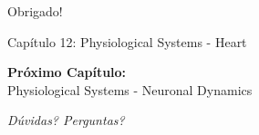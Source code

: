 \begin{frame}
\begin{center}
{\Huge Obrigado!}

\vspace{1cm}

{\Large Capítulo 12: Physiological Systems - Heart}

\vspace{1cm}

\textbf{Próximo Capítulo:}\\
Physiological Systems - Neuronal Dynamics

\vspace{1cm}

\textit{Dúvidas? Perguntas?}
\end{center}
\end{frame}


